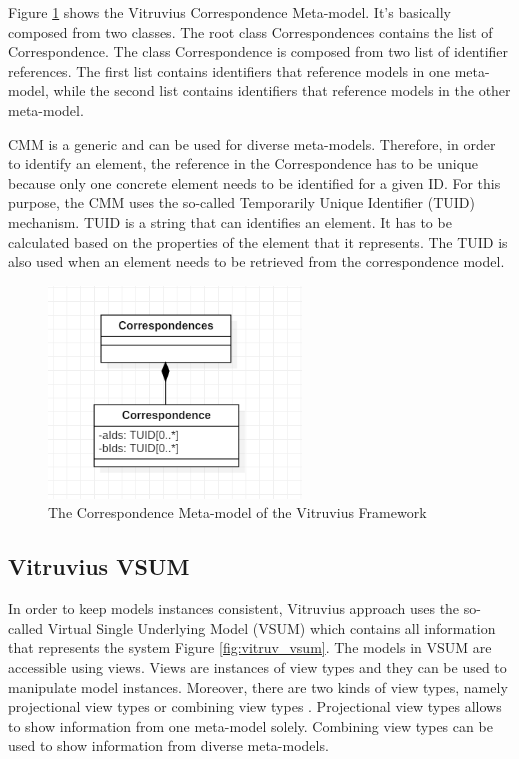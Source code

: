 Figure \ref{fig:correspondence_model} shows the Vitruvius Correspondence Meta-model. It's basically composed from two classes. The root class Correspondences contains the list of Correspondence. The class Correspondence is composed from two list of identifier references. The first list contains identifiers that reference models in one meta-model, while the second list contains identifiers that reference models in the other meta-model.

CMM is a generic and can be used for diverse meta-models. Therefore, in order to identify an element, the reference in the Correspondence has to be unique because only one concrete element needs to be identified for a given ID. For this purpose, the CMM uses the so-called Temporarily Unique Identifier (TUID) mechanism. TUID is a string that can identifies an element. It has to be calculated based on the properties of the element that it represents. The TUID is also used when an element needs to be retrieved from the correspondence model.    

\begin{figure}[h]
\centering
\includegraphics[width=0.6\textwidth]{figures/correspondence_model}
\caption{The Correspondence Meta-model of the Vitruvius Framework}
\label{fig:correspondence_model}
\end{figure}



\subsection{Vitruvius VSUM}
\label{sec:Vitruvius VSUM}
In order to keep models instances consistent, Vitruvius approach uses the so-called Virtual Single Underlying Model (VSUM) which contains all information that represents the system Figure \ref{fig:vitruv_vsum}. The models in VSUM are accessible using views. Views are instances of view types and they can be used to manipulate model instances. Moreover, there are two kinds of view types, namely projectional view types or combining view types \cite{burger2013flexible}. Projectional view types allows to show information from one meta-model solely. Combining view types can be used to show information from diverse meta-models.

